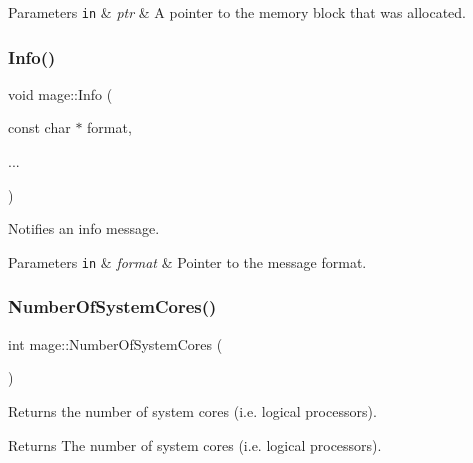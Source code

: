 \begin{DoxyParams}[1]{Parameters}
\mbox{\tt in}  & {\em ptr} & A pointer to the memory block that was allocated. \\
\hline
\end{DoxyParams}
\hypertarget{namespacemage_add6aa5f13960ce07b20f48d273956a91}{}\label{namespacemage_add6aa5f13960ce07b20f48d273956a91} 
\subsubsection{\texorpdfstring{Info()}{Info()}}
{\footnotesize\ttfamily void mage\+::\+Info (\begin{DoxyParamCaption}\item[{const char $\ast$}]{format,  }\item[{}]{... }\end{DoxyParamCaption})}

Notifies an info message.


\begin{DoxyParams}[1]{Parameters}
\mbox{\tt in}  & {\em format} & Pointer to the message format. \\
\hline
\end{DoxyParams}
\hypertarget{namespacemage_ab972a47121b68775bf2545b826a1d5be}{}\label{namespacemage_ab972a47121b68775bf2545b826a1d5be} 
\subsubsection{\texorpdfstring{Number\+Of\+System\+Cores()}{NumberOfSystemCores()}}
{\footnotesize\ttfamily int mage\+::\+Number\+Of\+System\+Cores (\begin{DoxyParamCaption}{ }\end{DoxyParamCaption})}

Returns the number of system cores (i.\+e. logical processors).

\begin{DoxyReturn}{Returns}
The number of system cores (i.\+e. logical processors). 
\end{DoxyReturn}
\hypertarget{namespacemage_a0325f02cf9fd84c5b61ff249630fb0cd}{}\label{namespacemage_a0325f02cf9fd84c5b61ff249630fb0cd} 
